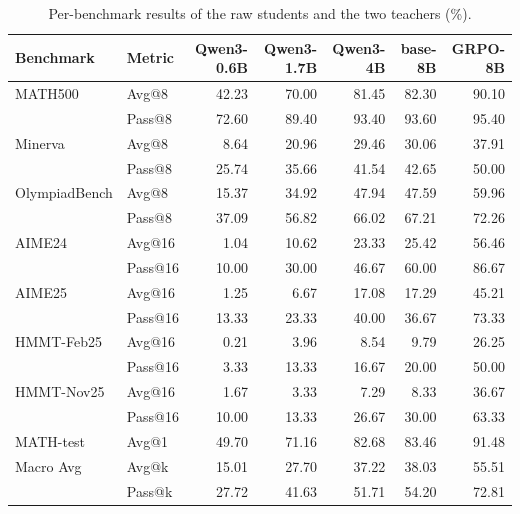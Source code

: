 \begin{table}[h]
\centering
\scriptsize
\caption{Per-benchmark results of the raw students and the two teachers (\%).}
\label{tab:app-base}
\begin{tabular}{llrrrrr}
\toprule
Benchmark & Metric & Qwen3-0.6B & Qwen3-1.7B & Qwen3-4B & base-8B & GRPO-8B \\
\midrule
MATH500 & Avg@8 & 42.23 & 70.00 & 81.45 & 82.30 & 90.10 \\
 & Pass@8 & 72.60 & 89.40 & 93.40 & 93.60 & 95.40 \\
Minerva & Avg@8 & 8.64 & 20.96 & 29.46 & 30.06 & 37.91 \\
 & Pass@8 & 25.74 & 35.66 & 41.54 & 42.65 & 50.00 \\
OlympiadBench & Avg@8 & 15.37 & 34.92 & 47.94 & 47.59 & 59.96 \\
 & Pass@8 & 37.09 & 56.82 & 66.02 & 67.21 & 72.26 \\
AIME24 & Avg@16 & 1.04 & 10.62 & 23.33 & 25.42 & 56.46 \\
 & Pass@16 & 10.00 & 30.00 & 46.67 & 60.00 & 86.67 \\
AIME25 & Avg@16 & 1.25 & 6.67 & 17.08 & 17.29 & 45.21 \\
 & Pass@16 & 13.33 & 23.33 & 40.00 & 36.67 & 73.33 \\
HMMT-Feb25 & Avg@16 & 0.21 & 3.96 & 8.54 & 9.79 & 26.25 \\
 & Pass@16 & 3.33 & 13.33 & 16.67 & 20.00 & 50.00 \\
HMMT-Nov25 & Avg@16 & 1.67 & 3.33 & 7.29 & 8.33 & 36.67 \\
 & Pass@16 & 10.00 & 13.33 & 26.67 & 30.00 & 63.33 \\
MATH-test & Avg@1 & 49.70 & 71.16 & 82.68 & 83.46 & 91.48 \\
\midrule
Macro Avg & Avg@k & 15.01 & 27.70 & 37.22 & 38.03 & 55.51 \\
 & Pass@k & 27.72 & 41.63 & 51.71 & 54.20 & 72.81 \\
\bottomrule
\end{tabular}
\end{table}
